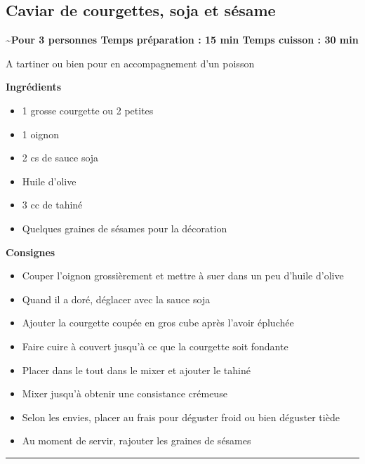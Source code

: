 \documentclass[]{book}
\providecommand{\tightlist}{%
  \setlength{\itemsep}{0pt}\setlength{\parskip}{0pt}}
\begin{document}
\subsection*{\texorpdfstring{{Caviar de courgettes, soja et
sésame}}{Caviar de courgettes, soja et sésame}}\label{caviar-de-courgettes-soja-et-suxe9same}

\begin{salebox}
\textbf{\textasciitilde{}Pour 3 personnes \textbar{} Temps préparation :
15 min \textbar{} Temps cuisson : 30 min}

A tartiner ou bien pour en accompagnement d'un poisson
\end{salebox}

 \textbf{Ingrédients}

\begin{itemize}
\tightlist
\item
  1 grosse courgette ou 2 petites
\item
  1 oignon
\item
  2 cs de sauce soja
\item
  Huile d'olive
\item
  3 cc de tahiné
\item
  Quelques graines de sésames pour la décoration
\end{itemize}

\textbf{Consignes}

\begin{itemize}
\tightlist
\item
  Couper l'oignon grossièrement et mettre à suer dans un peu d'huile
  d'olive
\item
  Quand il a doré, déglacer avec la sauce soja
\item
  Ajouter la courgette coupée en gros cube après l'avoir épluchée\\
\item
  Faire cuire à couvert jusqu'à ce que la courgette soit fondante
\item
  Placer dans le tout dans le mixer et ajouter le tahiné
\item
  Mixer jusqu'à obtenir une consistance crémeuse
\item
  Selon les envies, placer au frais pour déguster froid ou bien déguster
  tiède
\item
  Au moment de servir, rajouter les graines de sésames
\end{itemize}

\begin{center}\rule{0.5\linewidth}{0.5pt}\end{center}
\end{document}

